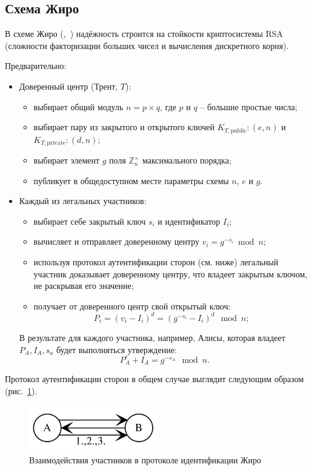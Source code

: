 \subsection{Схема Жиро}\label{section-girault-scheme}

В схеме Жиро (,~\cite{Girault:1990, Girault:1991}) надёжность строится на стойкости криптосистемы RSA (сложности факторизации больших чисел и вычисления дискретного корня).

Предварительно:
\begin{itemize}
    \item Доверенный центр (Трент, $T$):
    \begin{itemize}
        \item выбирает общий модуль $n = p \times q$, где $p$ и $q$ -- большие простые числа;
        \item выбирает пару из закрытого и открытого ключей $K_{T, \text{public}}: (e, n)$ и $K_{T, \text{private}}: (d, n)$;
        \item выбирает элемент $g$ поля $\mathbb{Z}_n^{\times}$ максимального порядка;
        \item публикует в общедоступном месте параметры схемы $n$, $e$ и $g$.
    \end{itemize}
    \item Каждый из легальных участников:
    \begin{itemize}
        \item выбирает себе закрытый ключ $s_i$ и идентификатор $I_i$;
        \item вычисляет и отправляет доверенному центру $v_i = g^{-s_i} \bmod n$;
        \item используя протокол аутентификации сторон (см. ниже) легальный участник доказывает доверенному центру, что владеет закрытым ключом, не раскрывая его значение;
        \item получает от доверенного центр свой открытый ключ:
            \[ P_i = (v_i - I_i)^d = (g^{-s_i} - I_i)^d \mod n; \]
    \end{itemize}
    В результате для каждого участника, например, Алисы, которая владеет $P_A, I_A, s_a$ будет выполняться утверждение:
        \[ P_A^e + I_A = g^{-s_A} \mod n. \]
\end{itemize}

Протокол аутентификации сторон в общем случае выглядит следующим образом (рис.~\ref{fig:key_distribution-girault-auth}).

\begin{figure}
    \centering
    \includegraphics[width=0.5\textwidth]{pic/key_distribution-girault-auth}
    \caption{Взаимодействия участников в протоколе идентификации Жиро\label{fig:key_distribution-girault-auth}}
\end{figure}

